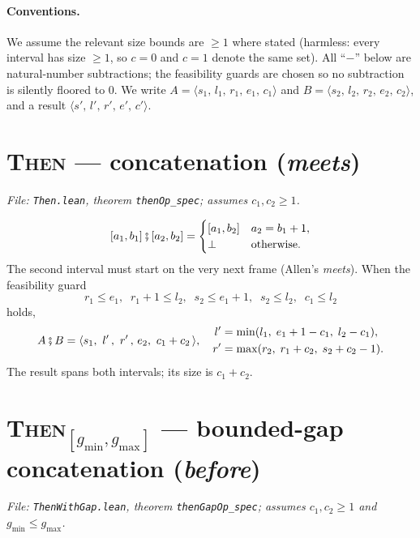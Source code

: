 \documentclass[11pt]{article}
\newcommand{\Empty}{\bot}                                 %
\newcommand{\R}[5]{\langle #1,\, #2,\, #3,\, #4,\, #5 \rangle} %
\newcommand{\gmin}{g_{\min}}
\newcommand{\gmax}{g_{\max}}
\newcommand{\Then}{\mathbin{\fatsemi}}                    %
\theoremstyle{definition}
\theoremstyle{plain}
\begin{document}
\paragraph{Conventions.}
We assume the relevant size bounds are $\ge 1$ where stated (harmless: every
interval has size $\ge 1$, so $c=0$ and $c=1$ denote the same set).  All
``$-$'' below are natural-number subtractions; the feasibility guards are chosen
so no subtraction is silently floored to $0$.  We write $A=\R{s_1}{l_1}{r_1}{e_1}{c_1}$
and $B=\R{s_2}{l_2}{r_2}{e_2}{c_2}$, and a result $\R{s'}{l'}{r'}{e'}{c'}$.

\section{\textsc{Then} — concatenation (\emph{meets})}
\label{sec:then}
\textit{File: \texttt{Then.lean}, theorem \texttt{thenOp\_spec}; assumes
$c_1,c_2\ge1$.}

\[
  [a_1,b_1] \Then [a_2,b_2] =
  \begin{cases} [a_1,b_2] & a_2 = b_1+1,\\ \Empty & \text{otherwise.}\end{cases}
\]
The second interval must start on the very next frame (Allen's \emph{meets}).
When the feasibility guard
\[
  r_1 \le e_1,\;\; r_1+1 \le l_2,\;\; s_2 \le e_1+1,\;\; s_2 \le l_2,\;\; c_1 \le l_2
\]
holds,
\[
  A \Then B = \R{s_1}{\,l'\,}{\,r'\,}{e_2}{\,c_1+c_2\,},\quad
  \begin{aligned}
    l' &= \min(l_1,\; e_1+1-c_1,\; l_2-c_1),\\
    r' &= \max(r_2,\; r_1+c_2,\; s_2+c_2-1).
  \end{aligned}
\]
The result spans both intervals; its size is $c_1+c_2$.

\section{\textsc{Then}$_{[\gmin,\gmax]}$ — bounded-gap concatenation (\emph{before})}
\label{sec:theng}
\textit{File: \texttt{ThenWithGap.lean}, theorem \texttt{thenGapOp\_spec}; assumes
$c_1,c_2\ge1$ and $\gmin\le\gmax$.}
\end{document}
